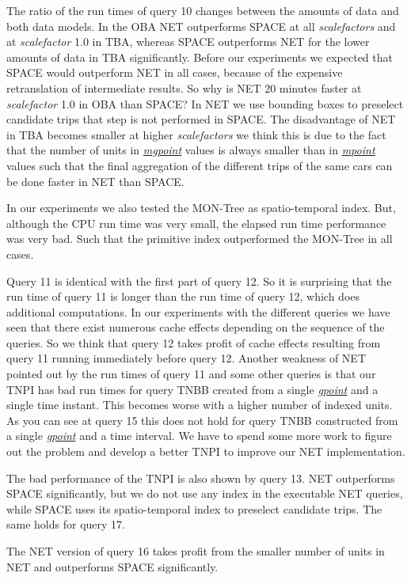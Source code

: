\documentclass[a4paper]{article}
\newcommand{\dt}[1]{\textsl{\underline{#1}}}
\begin{document}
The ratio of the run times of query 10 changes between the amounts of data and
both data models. In the OBA NET outperforms SPACE at all \textit{scalefactors}
and at \textit{scalefactor} 1.0 in TBA, whereas SPACE outperforms NET for the
lower amounts of data in TBA significantly.
Before our experiments we expected that SPACE would outperform NET in all cases,
because of the expensive retranslation of intermediate results.
So why is NET 20 minutes faster at \textit{scalefactor} 1.0 in OBA than SPACE?
In NET we use bounding boxes to preselect candidate trips that step is not
performed in SPACE. The disadvantage of NET in TBA becomes smaller at higher
\textit{scalefactors} we think this is due to the fact that the number of units in
\dt{mgpoint} values is always smaller than in \dt{mpoint} values such that the
final aggregation of the different trips of the same cars can be done faster
in NET than SPACE.

In our experiments we also tested the MON-Tree \cite{MONTreeAlmeidaGeoinformatica}
as spatio-temporal index. But, although the CPU run time was very small, the
elapsed run time performance was very bad. Such that the primitive index outperformed
the MON-Tree in all cases.

Query 11 is identical with the first part of query 12. So it is surprising that
the run time of query 11 is longer than the run time of query 12,
which does additional computations. In our experiments with the different queries
we have seen that there exist numerous cache effects depending on the sequence of
the queries. So we think that query 12 takes profit of cache effects resulting from
query 11 running immediately before query 12. Another weakness of NET pointed
out by the run times of query 11 and some other queries is that our TNPI has bad
run times for query TNBB created from a single \dt{gpoint} and a single
time instant. This becomes worse with a higher number of indexed units. As you can
see at query 15 this does not hold for query TNBB constructed from a single
\dt{gpoint} and a time interval. We have to spend some more work to figure out
the problem and develop a better TNPI to improve our NET implementation.

The bad performance of the TNPI is also shown by query 13.
NET outperforms SPACE significantly, but we do not use any index in the
executable NET queries, while SPACE uses its spatio-temporal index to preselect
candidate trips. The same holds for query 17.

The NET version of query 16 takes profit from the smaller number
of units in NET and outperforms SPACE significantly.
\end{document}
